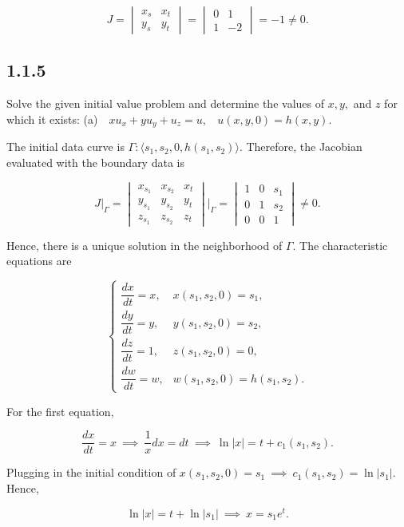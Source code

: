 \documentclass{article}
\begin{document}
\begin{flushleft}
$$J=\begin{vmatrix}
x_s & x_t \\
y_s & y_t
\end{vmatrix}=\begin{vmatrix}
0 & 1\\
1 & -2
\end{vmatrix}=-1 \neq 0.$$


\subsection{\textbf{1.1.5}} Solve the given initial value problem and determine the values of $x,y,$ and $z$ for which it exists:
\newline (a)~~$xu_x+yu_y+u_z=u,~~~~ u(x,y,0)=h(x,y).$

The initial data curve is $\Gamma: \langle s_1,s_2,0,h(s_1,s_2) \rangle$. Therefore, the Jacobian evaluated with the boundary data is

$$J\Bigg|_\Gamma=\begin{vmatrix}
x_{s_1} & x_{s_2} & x_t \\
y_{s_1} & y_{s_2} & y_t \\
z_{s_1} & z_{s_2} & z_t
\end{vmatrix}\Bigg|_\Gamma=\begin{vmatrix}
1 & 0 & s_1 \\
0 & 1 & s_2 \\
0 & 0 & 1
\end{vmatrix} \neq 0.$$

Hence, there is a unique solution in the neighborhood of $\Gamma$. The characteristic equations are 

\[ \begin{cases} 
      \dfrac{dx}{dt}=x, &  x(s_1,s_2,0)=s_1, \\[1em]
      \dfrac{dy}{dt}=y, & y(s_1,s_2,0)=s_2, \\[1em] 
      \dfrac{dz}{dt}=1, & z(s_1,s_2,0)=0,
      \\[1em] 
      \dfrac{dw}{dt}=w, & w(s_1,s_2,0)=h(s_1,s_2).
   \end{cases}
\]

For the first equation,

$$\frac{dx}{dt}=x ~\implies~ \frac{1}{x}dx = dt ~\implies~ \ln{|x|}=t+c_1(s_1,s_2).$$

Plugging in the initial condition of $ x(s_1,s_2,0)=s_1 ~\implies~  c_1(s_1,s_2)=\ln{|s_1|}$. Hence,

$$\ln{|x|}=t+\ln{|s_1|} ~\implies~  x=s_1e^t.$$


\end{flushleft}
\end{document}
